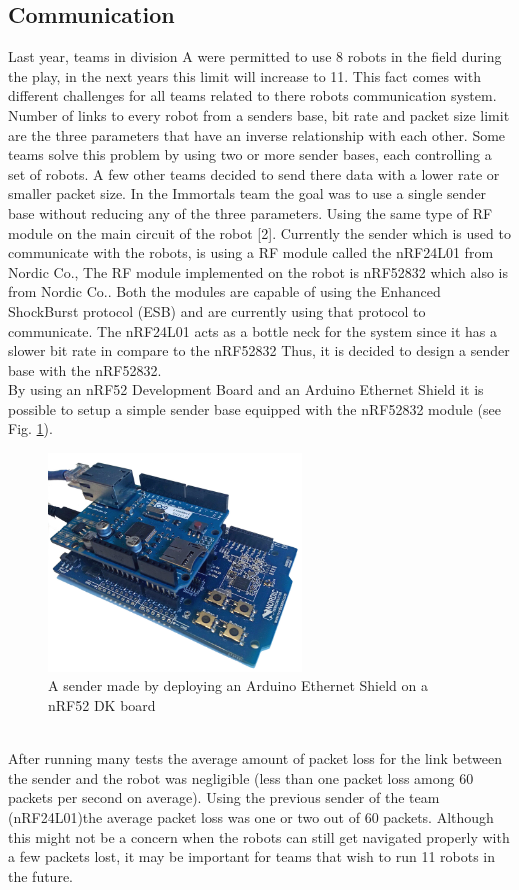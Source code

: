\subsection{Communication}
Last year, teams in division A were permitted to use 8 robots in the field during the play, in the next years this limit will increase to 11. This fact comes with different challenges for all teams related to there robots communication system.\\
\indent Number of links to every robot from a senders base, bit rate and packet size limit are the three parameters that have an inverse relationship with each other. Some teams solve this problem by using two or more sender bases, each controlling a set of robots. A few other teams decided to send there data with a lower rate or smaller packet size. In the Immortals team the goal was to use a single sender base without reducing any of the three parameters. Using the same type of RF module on the main circuit of the robot [2]. Currently the sender which is used to communicate with the robots, is using a RF module called the nRF24L01 from Nordic Co., The RF module implemented on the robot is nRF52832 which also is from Nordic Co.. Both the modules are capable of using the Enhanced ShockBurst protocol (ESB) and are currently using that protocol to communicate. The nRF24L01 acts as a bottle neck for the system since it has a slower bit rate in compare to the nRF52832 Thus, it is decided to design a sender base with the nRF52832.\\
\indent By using an nRF52 Development Board and an Arduino Ethernet Shield it is possible to setup a simple sender base equipped with the nRF52832 module (see Fig. \ref{fig:SIMPLE_SENDER}).\\
\begin{figure}
	\centering
	\includegraphics[width=0.6\textwidth]{images/NRF52832DK_ETH.png}
	\caption{A sender made by deploying an Arduino Ethernet Shield on a nRF52 DK board}
	\label{fig:SIMPLE_SENDER}
\end{figure}\\
\indent After running many tests the average amount of packet loss for the link between the sender and the robot was negligible (less than one packet loss among 60 packets per second on average). Using the previous sender of the team (nRF24L01)the average packet loss was one or two out of 60 packets. Although this might not be a concern when the robots can still get navigated properly with a few packets lost, it may be important for teams that wish to run 11 robots in the future.\\

